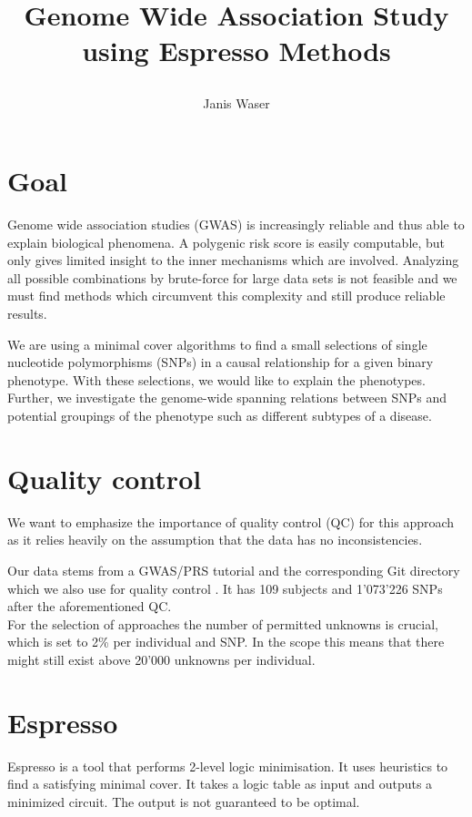 \documentclass[letterpaper, 11pt]{article}
\title{	

Genome Wide Association Study using Espresso Methods
}
\author{ Janis Waser}
\begin{document}
\maketitle




\section{Goal}
\label{sec:goal}
Genome wide association studies  (GWAS) is increasingly reliable and thus able to explain biological phenomena. A polygenic risk score is easily computable, but only gives limited insight to the inner mechanisms which are involved. Analyzing all possible combinations by brute-force for large data sets is not feasible and we must find methods which circumvent this complexity and still produce reliable results.

We are using a minimal cover algorithms to find a small selections of single nucleotide polymorphisms (SNPs) in a causal relationship for a given binary phenotype.  With these selections, we would like to explain the phenotypes.  Further, we investigate the genome-wide spanning relations between SNPs and potential groupings of the phenotype such as different subtypes of a disease. 


\tableofcontents
\newpage
\section {Quality control}
We want to emphasize the importance of quality control (QC) for this approach as it relies heavily on the assumption that the data has no inconsistencies. 

Our data stems from a GWAS/PRS tutorial and the corresponding Git directory which we also use for quality control \cite{tutorial}. It has 109 subjects and 1'073'226 SNPs after the aforementioned QC.  \\



For the selection of approaches the number of permitted unknowns is crucial, which is set to 2\% per individual and SNP. In the scope this means that there might still exist above 20'000 unknowns per individual. 
\section{Espresso}
Espresso is a tool that performs 2-level logic minimisation. It uses heuristics to find a satisfying minimal cover. It takes a logic table as input and outputs a minimized circuit.  The output is not guaranteed to be optimal. \\
\end{document}
